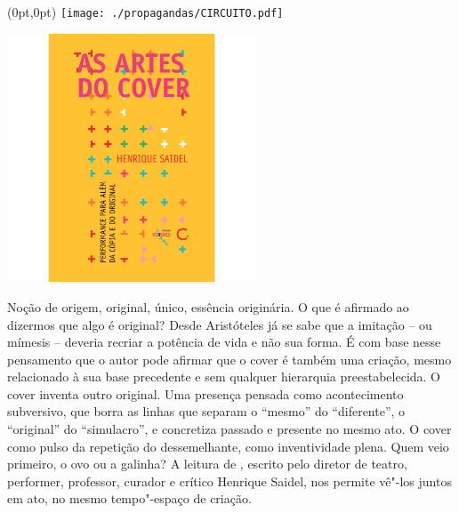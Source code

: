 \pagestyle{circuito}
\label{circuito}

\begin{textblock*}{5.625in}(0pt,0pt)%
\vspace*{-3.49cm}
\hspace*{-2.76cm}\texttt{[image: ./propagandas/CIRCUITO.pdf]}
\end{textblock*}

\pagebreak %


\begin{center}
\hspace*{.5cm}\includegraphics[width=74mm]{./grid/cover.jpg}
\end{center}

\hspace*{-7cm}\hrulefill\hspace*{-7cm}

\medskip

\noindent{}Noção de origem, original, único, essência originária. O que é afirmado ao dizermos que algo é original? Desde Aristóteles já se sabe que a imitação – ou mímesis – deveria recriar a potência de vida e não sua forma. É com base nesse pensamento que o autor pode afirmar que o cover é também uma criação, mesmo relacionado à sua base precedente e sem qualquer hierarquia preestabelecida. O cover inventa outro original.
 Uma presença pensada como acontecimento subversivo, que borra as linhas que separam o “mesmo” do “diferente”, o “original” do “simulacro”, e concretiza passado e presente no mesmo ato. O cover como pulso da repetição do dessemelhante, como inventividade plena. Quem veio primeiro, o ovo ou a galinha? A leitura de {}, escrito pelo diretor de teatro, performer, professor, curador e crítico Henrique Saidel, nos permite vê"-los juntos em ato, no mesmo tempo"-espaço de criação.


